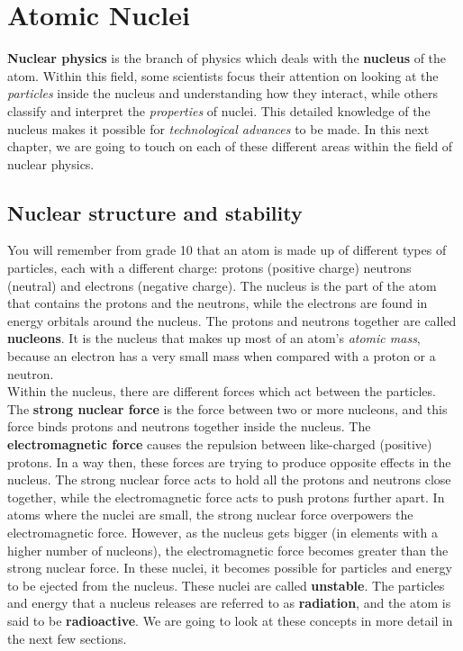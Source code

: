\chapter{Atomic Nuclei}
\label{chap:an}
\textbf{Nuclear physics} is the branch of physics which deals with the \textbf{nucleus} of the atom. Within this field, some scientists focus their attention on looking at the \textit{particles} inside the nucleus and understanding how they interact, while others classify and interpret the \textit{properties} of nuclei. This detailed knowledge of the nucleus makes it possible for \textit{technological advances} to be made. In this next chapter, we are going to touch on each of these different areas within the field of nuclear physics.\\


\section{Nuclear structure and stability}
\label{sec:an:ns}

You will remember from grade 10 that an atom is made up of different types of particles, each with a different charge: protons (positive charge) neutrons (neutral) and electrons (negative charge). The nucleus is the part of the atom that contains the protons and the neutrons, while the electrons are found in energy orbitals around the nucleus. The protons and neutrons together are called \textbf{nucleons}. It is the nucleus that makes up most of an atom's \textit{atomic mass}, because an electron has a very small mass when compared with a proton or a neutron.\\

Within the nucleus, there are different forces which act between the particles. The \textbf{strong nuclear force} is the force between two or more nucleons, and this force binds protons and neutrons together inside the nucleus. The \textbf{electromagnetic force} causes the repulsion between like-charged (positive) protons. In a way then, these forces are trying to produce opposite effects in the nucleus. The strong nuclear force acts to hold all the protons and neutrons close together, while the electromagnetic force acts to push protons further apart. In atoms where the nuclei are small, the strong nuclear force overpowers the electromagnetic force. However, as the nucleus gets bigger (in elements with a higher number of nucleons), the electromagnetic force becomes greater than the strong nuclear force. In these nuclei, it becomes possible for particles and energy to be ejected from the nucleus. These nuclei are called \textbf{unstable}. The particles and energy that a nucleus releases are referred to as \textbf{radiation}, and the atom is said to be \textbf{radioactive}. We are going to look at these concepts in more detail in the next few sections.



